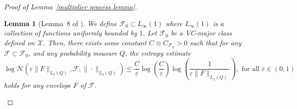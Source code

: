 \documentclass[12pt]{article}
\newtheorem{lemma}[theorem]{Lemma}
\begin{document}
\begin{appendices}
\begin{proof}[Proof of Lemma~\ref{multiplier process lemma}]
\begin{lemma}[Lemma~8 of \cite{han2018robustness}]\label{lamma:entropy-integral}
We define $\mathcal{F}_0 \subset L_{\infty}(1)$ where $L_{\infty}(1)$ is a collection of functions uniformly bounded by $1$. Let $\mathcal{F}_0$ be a VC-major class defined on $\mathcal{X}$. Then, there exists some constant $C \equiv C_{\mathcal{F}_0}>0$ such that for any $\mathcal{F} \subset \mathcal{F}_0$, and any probability measure $Q$, the entropy estimate
\begin{equation}\nonumber
\log \mathcal{N}\left(\varepsilon\|F\|_{L_2(Q)}, \mathcal{F}, \|\cdot\|_{L_2(Q)}\right) \leq \frac{C}{\varepsilon} \log \left(\frac{C}{\varepsilon}\right) \log \left(\frac{1}{\varepsilon\|F\|_{L_2(Q)}}\right), \text { for all } \varepsilon \in(0,1)
\end{equation}
holds for any envelope $F$ of $\mathcal{F}$.
\end{lemma}


\end{proof}
\end{appendices}
\end{document}
